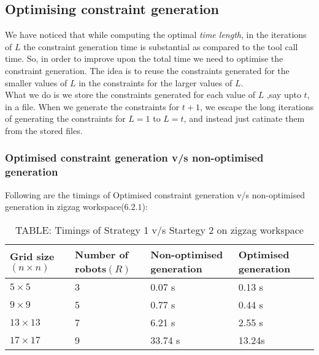\documentclass{article}[11pt]
\begin{document}
		\subsection{Optimising constraint generation}
			We have noticed that while computing the optimal \textit{time length}, in the iterations of $L$ the constraint generation time is substantial as compared to the tool call time. So, in order to improve upon the total time we need to optimise the constraint generation. The idea is to reuse the constraints generated for the smaller values of $L$ in the constraints for the larger values of $L$.\\

			What we do is we store the constraints generated for each value of $L$ ,say upto $t$, in a file. When we generate the constraints for $t+1$, we escape the long iterations of generating the constraints for $L=1$ to $L=t$, and instead just catinate them from the stored files.

			\subsubsection{Optimised constraint generation v/s non-optimised generation}
			Following are the timings of Optimised constraint generation v/s non-optimised generation in zigzag workspace($6.2.1$):
				\begin{table}[h!]
				\centering
				\begin{tabular}{|| p{2cm} | p{2cm} | p{2cm} | p{2cm} ||} 
				 \hline\hline
				 Grid size$(n \times n)$ & Number of robots$(R)$ & Non-optimised generation & Optimised generation \\ [0.5ex] 
				 \hline\hline
				 $5 \times 5$ & 3 & 0.07 s & 0.13 s\\ 
				 $9 \times 9$ & 5  & 0.77 s & 0.44 s\\
				 $13 \times 13$ & 7  & 6.21 s & 2.55 s\\
				 $17 \times 17$ & 9  & 33.74 s & 13.24s \\ [1ex]
				 \hline
				\end{tabular}
				\caption*{TABLE: Timings of Strategy 1 v/s Startegy 2 on zigzag workspace}
				\end{table}
\end{document}
